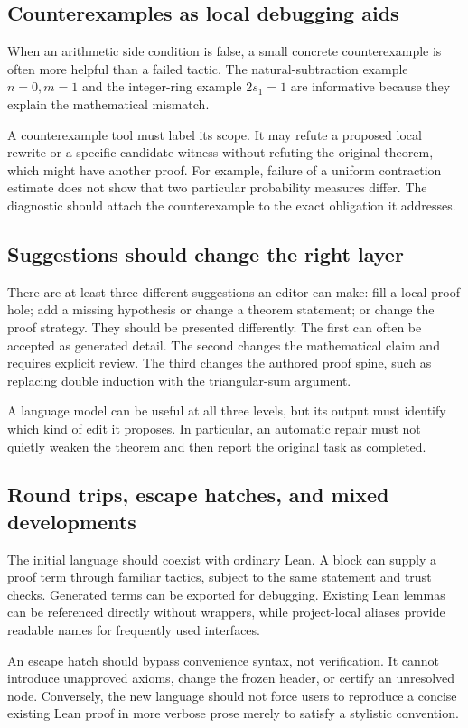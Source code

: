 \documentclass[11pt,letterpaper]{article}
\theoremstyle{definition}
\theoremstyle{remark}
\newcommand{\code}[1]{\texttt{\detokenize{#1}}}
\begin{document}
\subsection{Counterexamples as local debugging aids}
When an arithmetic side condition is false, a small concrete counterexample is often more helpful than a failed tactic. The natural-subtraction example $n=0,m=1$ and the integer-ring example $2s_1=1$ are informative because they explain the mathematical mismatch.

A counterexample tool must label its scope. It may refute a proposed local rewrite or a specific candidate witness without refuting the original theorem, which might have another proof. For example, failure of a uniform contraction estimate does not show that two particular probability measures differ. The diagnostic should attach the counterexample to the exact obligation it addresses.

\subsection{Suggestions should change the right layer}
There are at least three different suggestions an editor can make: fill a local proof hole; add a missing hypothesis or change a theorem statement; or change the proof strategy. They should be presented differently. The first can often be accepted as generated detail. The second changes the mathematical claim and requires explicit review. The third changes the authored proof spine, such as replacing double induction with the triangular-sum argument.

A language model can be useful at all three levels, but its output must identify which kind of edit it proposes. In particular, an automatic repair must not quietly weaken the theorem and then report the original task as completed.

\subsection{Round trips, escape hatches, and mixed developments}
The initial language should coexist with ordinary Lean. A \code{by lean \{ ... \}} block can supply a proof term through familiar tactics, subject to the same statement and trust checks. Generated terms can be exported for debugging. Existing Lean lemmas can be referenced directly without wrappers, while project-local aliases provide readable names for frequently used interfaces.

An escape hatch should bypass convenience syntax, not verification. It cannot introduce unapproved axioms, change the frozen header, or certify an unresolved node. Conversely, the new language should not force users to reproduce a concise existing Lean proof in more verbose prose merely to satisfy a stylistic convention.
\end{document}
